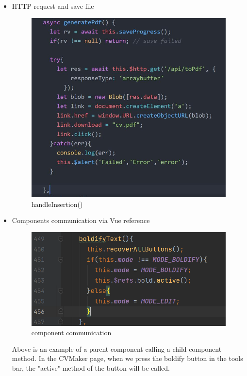 \documentclass[11pt]{article}
\begin{document}
\begin{spacing}{1.0}
\begin{itemize}
	\item HTTP request and save file
	\begin{figure}[H]
	\centering
	\includegraphics[scale=.5]{figures/js/generatePdf.jpg}
	\caption{handleInsertion()}
\end{figure}

	\item Components communication via Vue reference
	\begin{figure}[H]
	\centering
	\includegraphics[scale=.5]{figures/componentsRefs.png}
	\caption{component communication}
\end{figure}
	
	
	Above is an example of a parent component calling a child component method. In the CVMaker page, when we press the boldify button in the tools bar, the "active" method of the button will be called.
	

\end{itemize}
\end{spacing}
\end{document}
